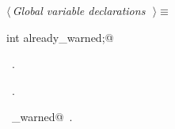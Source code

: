 \documentclass{report}
\begin{document}
\begin{flushleft} \small
\begin{minipage}{\linewidth} \label{scrap154}
$\langle\,${\it Global variable declarations}\nobreak\ {\footnotesize {}}$\,\rangle\equiv$
\vspace{-1ex}
\begin{list}{}{} \item
\mbox{}\verb@extern int already_warned;@\\
\mbox{}\verb@@{\NWsep}
\end{list}
\vspace{-1ex}
\footnotesize\addtolength{\baselineskip}{-1ex}
\begin{list}{}{\setlength{\itemsep}{-\parsep}\setlength{\itemindent}{-\leftmargin}}
\item \NWtxtMacroDefBy\ .
\item \NWtxtMacroRefIn\ .
\end{list}
\vspace{-2ex}
\footnotesize\addtolength{\baselineskip}{-1ex}
\begin{list}{}{\setlength{\itemsep}{-\parsep}\setlength{\itemindent}{-\leftmargin}}
\item \NWtxtIdentsDefed\nobreak\  \verb@already_warned@\nobreak\ .\end{list}
\end{minipage}\\[4ex]
\end{flushleft}
\end{document}
